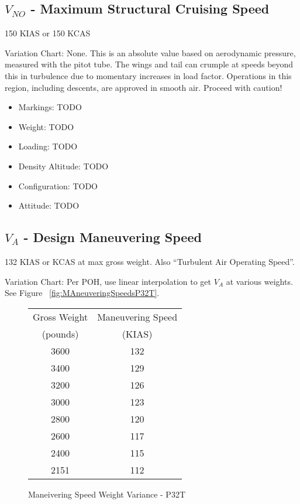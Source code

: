 \subsection{$V_{NO}$ - Maximum Structural Cruising Speed}

150 KIAS or 150 KCAS

Variation Chart: None. This is an absolute value based on aerodynamic pressure, measured with the pitot tube. The wings and tail can crumple at speeds beyond this in turbulence due to momentary increases in load factor. Operations in this region, including descents, are approved in smooth air. Proceed with caution!

\begin{itemize}
\item Markings: TODO
\item Weight: TODO
\item Loading: TODO
\item Density Altitude: TODO
\item Configuration: TODO
\item Attitude: TODO
\end{itemize}

\subsection{$V_A$ - Design Maneuvering Speed}

132 KIAS or KCAS at max gross weight. Also ``Turbulent Air Operating Speed''.

Variation Chart: Per POH, use linear interpolation to get $V_A$ at various weights. See Figure ~\ref{fig:MAneuveringSpeedsP32T}.

\begin{figure}
\begin{center}
\begin{tabular}{ |c|c| }
    \hline
    Gross Weight & Maneuvering Speed \\
    (pounds) & (KIAS) \\
    \hline
     3600 &  132 \\
     3400 &  129 \\
    \hline
     3200 &  126 \\
     3000 &  123 \\
    \hline
     2800 &  120 \\
     2600 &  117 \\
    \hline
     2400 &  115 \\
     2151 &  112 \\
    \hline
\end{tabular}
\end{center}
\caption{Maneivering Speed Weight Variance - P32T}
\label{fig:ManeuveringSpeedsP32T}
\end{figure}

